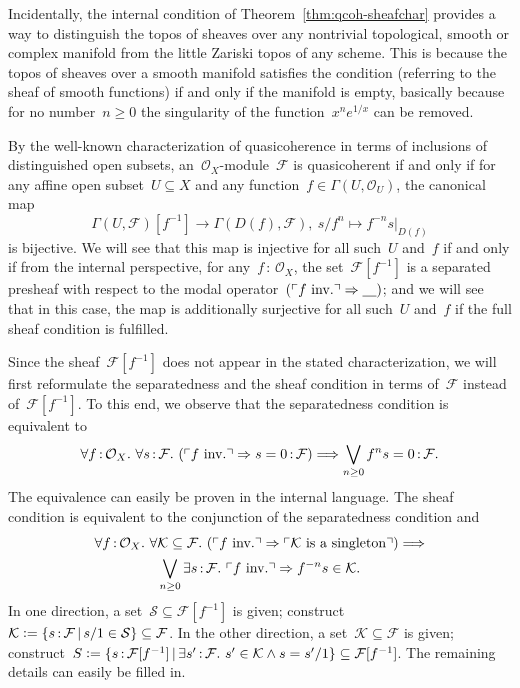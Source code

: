 \documentclass[10pt,reqno,a4paper]{amsbook}
\makeatletter
\theoremstyle{definition}
\theoremstyle{plain}
\theoremstyle{remark}
\newcommand{\F}{\mathcal{F}}
\renewcommand{\O}{\mathcal{O}}
\newcommand{\K}{\mathcal{K}}
\renewcommand{\S}{\mathcal{S}}
\newcommand{\placeholder}{\underline{\quad}}
\newcommand{\?}{\,{:}\,}
\renewcommand{\_}{\mathpunct{.}\,}
\newcommand{\speak}[1]{\ulcorner\text{\textnormal{#1}}\urcorner}
\newcommand{\lra}{\longrightarrow}
\newcommand{\inv}{inv.\@}
\newcommand{\defeq}{\vcentcolon=}
\renewenvironment{proof}[1][\proofname]{\par
  \pushQED{\qed}%
  \normalfont \topsep6\p@\@plus6\p@\relax
  \trivlist
  \item[\hskip\labelsep
        \itshape
    #1\@addpunct{.}]\ignorespaces
}{%
  \popQED\endtrivlist\@endpefalse
}
\makeatother
\begin{document}
Incidentally, the internal condition of Theorem~\ref{thm:qcoh-sheafchar}
provides a way to distinguish the topos of sheaves over any nontrivial
topological, smooth or complex manifold from the little Zariski topos of any
scheme. This is because the topos of sheaves over a smooth manifold satisfies
the condition (referring to the sheaf of smooth functions) if and only if the
manifold is empty, basically because for no number~$n \geq 0$ the singularity
of the function~$x^n e^{1/x}$ can be removed.

\begin{proof}[Proof of Theorem~\ref{thm:qcoh-sheafchar}]
By the well-known characterization of quasicoherence in terms of inclusions of
distinguished open subsets, an~$\O_X$-module~$\F$ is quasicoherent if and only
if for any affine open subset~$U \subseteq X$ and any function~$f \in
\Gamma(U,\O_U)$, the canonical map
\begin{equation}\label{eqn:restr-map}
  \Gamma(U,\F)[f^{-1}] \lra \Gamma(D(f),\F), \ s/f^n \longmapsto
  f^{-n} s|_{D(f)}
\end{equation}
is bijective. We will see that this map is injective for all such~$U$ and~$f$
if and only if from the internal perspective, for any~$f\?\O_X$, the set~$\F[f^{-1}]$ is a
separated presheaf with respect to the modal operator~$(\speak{$f$ \inv}
\Rightarrow \placeholder)$; and we will see that in this
case, the map is additionally surjective for all such~$U$ and~$f$ if the full
sheaf condition is fulfilled.

Since the sheaf~$\F[f^{-1}]$ does not appear in the stated characterization, we
will first reformulate the separatedness and the sheaf condition in terms
of~$\F$ instead of~$\F[f^{-1}]$. To this end, we observe that the separatedness
condition is equivalent to
\begin{equation}\label{eqn:separated}
  \forall f\?\O_X\_ \forall s\?\F\_
  (\speak{$f$ \inv} \Rightarrow s = 0 \? \F) \Longrightarrow
  \bigvee_{n \geq 0} f^n s = 0 \? \F.
\end{equation}
The equivalence can easily be proven in the internal language. The sheaf
condition is equivalent to the conjunction of the separatedness condition and
\begin{multline}\label{eqn:sheaf}
  \forall f\?\O_X\_ \forall \K \subseteq \F\_
  (\speak{$f$ \inv} \Rightarrow \speak{$\K$ is a singleton})
  \Longrightarrow \\
  \bigvee_{n \geq 0} \exists s\?\F\_
  \speak{$f$ \inv} \Rightarrow f^{-n} s \in \K.
\end{multline}
In one direction, a set~$\S \subseteq \F[f^{-1}]$ is given; construct~$\K \defeq \{
s\?\F \,|\, s/1 \in \S \} \subseteq \F$. In the other direction, a set~$\K
\subseteq \F$ is given; construct~$S \defeq \{ s\?\F[f^{-1}] \,|\, \exists
s'\?\F\_ s' \in \K \wedge s = s'/1 \} \subseteq \F[f^{-1}]$. The remaining
details can easily be filled in.


\end{proof}
\end{document}
